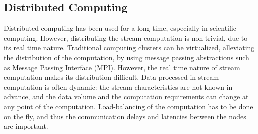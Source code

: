 \subsection{Distributed Computing}
Distributed computing has been used for a long time, especially in scientific computing. However, distributing the stream computation is non-trivial, due to its real time nature. Traditional computing clusters can be virtualized, alleviating the distribution of the computation, by using message passing abstractions such as Message Passing Interface (MPI). However, the real time nature of stream computation makes its distribution difficult. Data processed in stream computation is often dynamic: the stream characteristics are not known in advance, and the data volume and the computation requirements can change at any point of the computation. Load-balancing of the computation has to be done on the fly, and thus the communication delays and latencies between the nodes are important.


